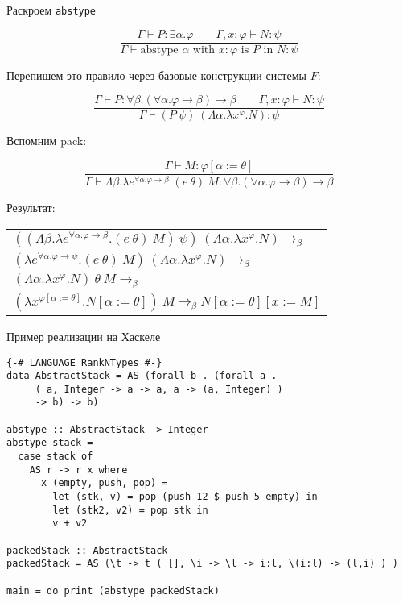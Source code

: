 \documentclass[aspectratio=169]{beamer}
\begin{document}
\begin{frame}{Раскроем \texttt{abstype}}

	$$\dfrac{\Gamma \vdash P : \exists \alpha . \varphi\qquad\Gamma, x : \varphi \vdash N : \psi}{\Gamma \vdash \text{abstype } \alpha \text{ with } x:\varphi \text{ is } P \text{ in } N:\psi}$$

Перепишем это правило через базовые конструкции системы $F$:

$$\dfrac{\Gamma\vdash P:\forall \beta.(\forall \alpha.\varphi\rightarrow\beta)\rightarrow\beta\qquad\Gamma,x:\varphi\vdash N:\psi}
        {\Gamma\vdash (P\ \psi)\ (\Lambda \alpha.\lambda x^\varphi.N) : \psi}$$

Вспомним pack:

$$\dfrac{\Gamma\vdash M : \varphi[\alpha:=\theta]}{\Gamma\vdash\Lambda \beta.\lambda e^{\forall \alpha.\varphi\rightarrow\beta}.(e\ \theta)\ M : \forall \beta.(\forall \alpha.\varphi\rightarrow\beta)\rightarrow \beta}$$

Результат:

\begin{center}\begin{tabular}{l}
$((\Lambda \beta.\lambda e^{\forall \alpha.\varphi\rightarrow\beta}.(e\ \theta)\ M)\ \psi)\ (\Lambda \alpha.\lambda x^\varphi.N) \rightarrow_\beta$\\
$(\lambda e^{\forall \alpha.\varphi\rightarrow\psi}.(e\ \theta)\ M)\ (\Lambda \alpha.\lambda x^\varphi.N) \rightarrow_\beta$\\
$(\Lambda \alpha.\lambda x^\varphi.N)\ \theta\ M \rightarrow_\beta$\\
$(\lambda x^{\varphi[\alpha:=\theta]}.N[\alpha:=\theta])\ M \rightarrow_\beta N[\alpha:=\theta][x := M]$
\end{tabular}\end{center}

\end{frame}

\begin{frame}[fragile]{Пример реализации на Хаскеле}
\footnotesize
\begin{verbatim}
{-# LANGUAGE RankNTypes #-}
data AbstractStack = AS (forall b . (forall a . 
     ( a, Integer -> a -> a, a -> (a, Integer) ) 
     -> b) -> b)

abstype :: AbstractStack -> Integer
abstype stack =
  case stack of
    AS r -> r x where
      x (empty, push, pop) =
        let (stk, v) = pop (push 12 $ push 5 empty) in
        let (stk2, v2) = pop stk in 
        v + v2

packedStack :: AbstractStack
packedStack = AS (\t -> t ( [], \i -> \l -> i:l, \(i:l) -> (l,i) ) )

main = do print (abstype packedStack)
\end{verbatim}
\end{frame}
\end{document}
